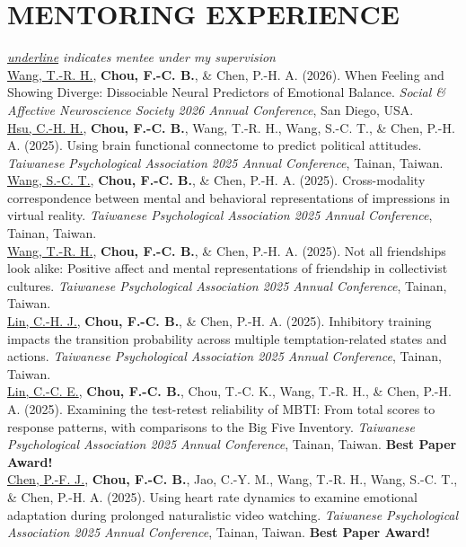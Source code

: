 \documentclass[a4paper,12pt]{article}
\newcommand{\sectionspace}{0pt} %
\newcommand{\itemspace}{7pt} %
\begin{document}
\vspace{\sectionspace}

\section*{MENTORING EXPERIENCE}
\textit{\underline{underline} indicates mentee under my supervision} \\[10pt]
\noindent \underline{Wang, T.-R. H.}, \textbf{Chou, F.-C. B.}, \& Chen, P.-H. A. (2026). When Feeling and Showing Diverge: Dissociable Neural Predictors of Emotional Balance. \textit{Social \& Affective Neuroscience Society 2026 Annual Conference}, San Diego, USA. \\[\itemspace]
\noindent \underline{Hsu, C.-H. H.}, \textbf{Chou, F.-C. B.}, Wang, T.-R. H., Wang, S.-C. T., \& Chen, P.-H. A. (2025). Using brain functional connectome to predict political attitudes. \textit{Taiwanese Psychological Association 2025 Annual Conference}, Tainan, Taiwan. \\[\itemspace]
\noindent \underline{Wang, S.-C. T.}, \textbf{Chou, F.-C. B.}, \& Chen, P.-H. A. (2025). Cross-modality correspondence between mental and behavioral representations of impressions in virtual reality. \textit{Taiwanese Psychological Association 2025 Annual Conference}, Tainan, Taiwan. \\[\itemspace]
\noindent \underline{Wang, T.-R. H.}, \textbf{Chou, F.-C. B.}, \& Chen, P.-H. A. (2025). Not all friendships look alike: Positive affect and mental representations of friendship in collectivist cultures. \textit{Taiwanese Psychological Association 2025 Annual Conference}, Tainan, Taiwan. \\[\itemspace]
\noindent \underline{Lin, C.-H. J.}, \textbf{Chou, F.-C. B.}, \& Chen, P.-H. A. (2025). Inhibitory training impacts the transition probability across multiple temptation-related states and actions. \textit{Taiwanese Psychological Association 2025 Annual Conference}, Tainan, Taiwan. \\[\itemspace]
\noindent \underline{Lin, C.-C. E.}, \textbf{Chou, F.-C. B.}, Chou, T.-C. K., Wang, T.-R. H., \& Chen, P.-H. A. (2025). Examining the test-retest reliability of MBTI: From total scores to response patterns, with comparisons to the Big Five Inventory. \textit{Taiwanese Psychological Association 2025 Annual Conference}, Tainan, Taiwan. \textbf{Best Paper Award!} \\[\itemspace]
\noindent \underline{Chen, P.-F. J.}, \textbf{Chou, F.-C. B.}, Jao, C.-Y. M., Wang, T.-R. H., Wang, S.-C. T., \& Chen, P.-H. A. (2025). Using heart rate dynamics to examine emotional adaptation during prolonged naturalistic video watching. \textit{Taiwanese Psychological Association 2025 Annual Conference}, Tainan, Taiwan.  \textbf{Best Paper Award!} \\[\itemspace]
\end{document}

